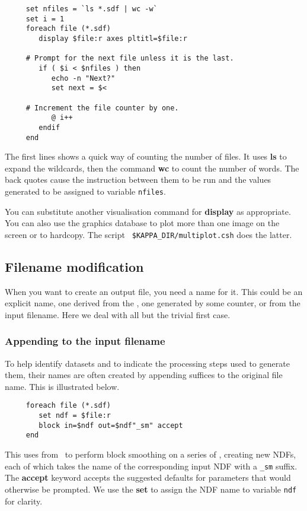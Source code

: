 \small
\begin{verbatim}
     set nfiles = `ls *.sdf | wc -w`
     set i = 1
     foreach file (*.sdf)
        display $file:r axes pltitl=$file:r

     # Prompt for the next file unless it is the last.
        if ( $i < $nfiles ) then
           echo -n "Next?"
           set next = $<

     # Increment the file counter by one.
           @ i++
        endif
     end
\end{verbatim}
\normalsize
The first lines shows a quick way of counting the number of files. It
uses {\bf ls} to expand the wildcards, then the command {\bf wc} to
count the number of words.  The back quotes cause the instruction
between them to be run and the values generated to be assigned to
variable {\tt nfiles}.

You can substitute another visualisation command for {\bf display}
as appropriate.  You can also use the graphics database to plot more
than one image on the screen or to hardcopy.  The script {\tt
\$KAPPA\_DIR/multiplot.csh} does the latter.

\subsection{Filename modification
\label{sc4_se_filename_mod}}

 When you
want to create an output file, you need a name for it.  This could be an
explicit name, one derived from the , one
generated by some counter, or from the input filename.  Here we deal
with all but the trivial first case.

\subsubsection{Appending to the input
filename\label{sc4_se_append_filename}}

To help identify datasets and to indicate the processing steps used to
generate them, their names are often created by appending suffices to
the original file name.  This is illustrated below.

\small
\begin{verbatim}
     foreach file (*.sdf)
        set ndf = $file:r
        block in=$ndf out=$ndf"_sm" accept
     end
\end{verbatim}
\normalsize
This uses  from \KAPPAref\ to perform
block smoothing on a series of , creating new NDFs,
each of which takes the name of the corresponding input NDF with a
{\tt \_sm} suffix.  The {\bf accept} keyword accepts the suggested
defaults for parameters that would otherwise be prompted.  We use the
{\bf set} to assign the NDF name to variable {\tt ndf} for clarity.

